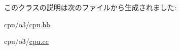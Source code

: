 このクラスの説明は次のファイルから生成されました:\begin{DoxyCompactItemize}
\item 
cpu/o3/\hyperlink{o3_2cpu_8hh}{cpu.hh}\item 
cpu/o3/\hyperlink{o3_2cpu_8cc}{cpu.cc}\end{DoxyCompactItemize}

